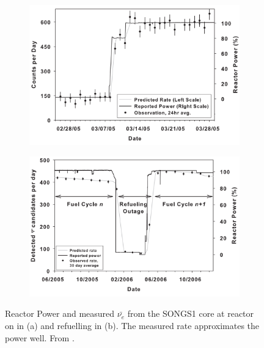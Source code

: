 \begin{figure}[!h]
\centering
\begin{subfigure}{.5\textwidth}
  \centering
  \includegraphics[width=\linewidth]{Chapter1/Figs/reactorPowerSongsS1.png}
  \captionsetup{width=.9\linewidth}
  \caption{}
  \label{subFig:reactorPowerSongsS1}
\end{subfigure}%
\begin{subfigure}{.5\textwidth}
  \centering
\includegraphics[width=\linewidth]{Chapter1/Figs/reactorRefulingSongs1.png}
  \captionsetup{width=.9\linewidth}
  \caption{}
  \label{subFig:reactorRefulingSongs1}
\end{subfigure}
\caption{Reactor Power and measured $\bar{\nu_e}$ from the SONGS1 core at reactor on in (a) and refuelling in (b). The measured rate approximates the power well. From \cite{Bowden_2008}.}
\label{fig:reactorPowerAndRefuelingSongsS1}
\end{figure}

